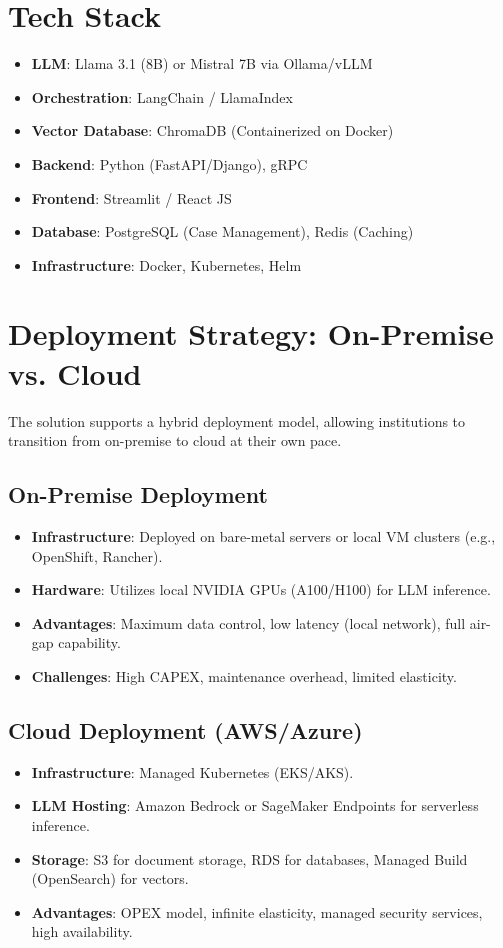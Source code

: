 \documentclass{article}
\begin{document}
\section{Tech Stack}
\begin{itemize}
    \item \textbf{LLM}: Llama 3.1 (8B) or Mistral 7B via Ollama/vLLM
    \item \textbf{Orchestration}: LangChain / LlamaIndex
    \item \textbf{Vector Database}: ChromaDB (Containerized on Docker)
    \item \textbf{Backend}: Python (FastAPI/Django), gRPC
    \item \textbf{Frontend}: Streamlit / React JS
    \item \textbf{Database}: PostgreSQL (Case Management), Redis (Caching)
    \item \textbf{Infrastructure}: Docker, Kubernetes, Helm
\end{itemize}

\section{Deployment Strategy: On-Premise vs. Cloud}
The solution supports a hybrid deployment model, allowing institutions to transition from on-premise to cloud at their own pace.

\subsection{On-Premise Deployment}
\begin{itemize}
    \item \textbf{Infrastructure}: Deployed on bare-metal servers or local VM clusters (e.g., OpenShift, Rancher).
    \item \textbf{Hardware}: Utilizes local NVIDIA GPUs (A100/H100) for LLM inference.
    \item \textbf{Advantages}: Maximum data control, low latency (local network), full air-gap capability.
    \item \textbf{Challenges}: High CAPEX, maintenance overhead, limited elasticity.
\end{itemize}

\subsection{Cloud Deployment (AWS/Azure)}
\begin{itemize}
    \item \textbf{Infrastructure}: Managed Kubernetes (EKS/AKS).
    \item \textbf{LLM Hosting}: Amazon Bedrock or SageMaker Endpoints for serverless inference.
    \item \textbf{Storage}: S3 for document storage, RDS for databases, Managed Build (OpenSearch) for vectors.
    \item \textbf{Advantages}: OPEX model, infinite elasticity, managed security services, high availability.
\end{itemize}
\end{document}

